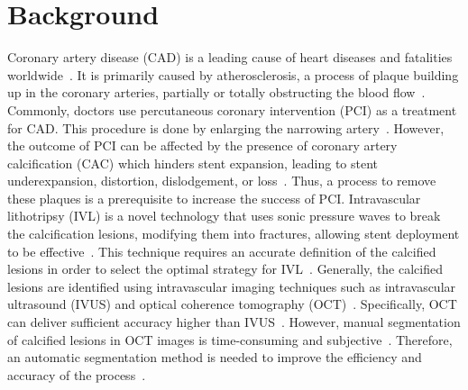 \documentclass[a4paper,11pt,oneside]{report}
\begin{document}
\chapter{Background}


Coronary artery disease (CAD) is a leading cause of heart diseases and fatalities worldwide~\cite{Virani2021Heart, Wu2015}. It is primarily caused by atherosclerosis, a process of plaque building up in the coronary arteries, partially or totally obstructing the blood flow~\cite{Shahjehan2023}. Commonly, doctors use percutaneous coronary intervention (PCI) as a treatment for CAD. This procedure is done by enlarging the narrowing artery~\cite{Ahmad2023}. However, the outcome of PCI can be affected by the presence of coronary artery calcification (CAC) which hinders stent expansion, leading to stent underexpansion, distortion, dislodgement, or loss~\cite{Hennessey2023}. Thus, a process to remove these plaques is a prerequisite to increase the success of PCI. Intravascular lithotripsy (IVL) is a novel technology that uses sonic pressure waves to break the calcification lesions, modifying them into fractures, allowing stent deployment to be effective~\cite{Butt2023}. This technique requires an accurate definition of the calcified lesions in order to select the optimal strategy for IVL~\cite{Butt2023}. Generally, the calcified lesions are identified using intravascular imaging techniques such as intravascular ultrasound (IVUS) and optical coherence tomography (OCT)~\cite{Butt2023}. Specifically, OCT can deliver sufficient accuracy higher than IVUS~\cite{Fujimoto2003, Costopoulos2016}. However, manual segmentation of calcified lesions in OCT images is time-consuming and subjective~\cite{Segars2013, Oktay2020, Carpenter2022}. Therefore, an automatic segmentation method is needed to improve the efficiency and accuracy of the process~\cite{Carpenter2022}.
\end{document}
